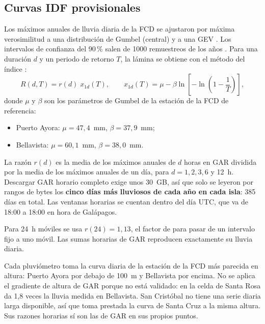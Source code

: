 \documentclass{sosg-informe}
\begin{document}
\subsection{Curvas IDF provisionales}\label{sec:idf}
Los máximos anuales de lluvia diaria de la FCD se ajustaron por máxima verosimilitud a una distribución de Gumbel (central) y a una GEV \citep[sensibilidad;][]{coles2001}. Los intervalos de confianza del 90\,\% salen de 1000 remuestreos de los años \citep[\emph{bootstrap};][]{efron1993}. Para una duración $d$ y un periodo de retorno $T$, la lámina se obtiene con el método del índice \citep{hosking1997}:
\begin{equation}
  R(d,T) = r(d)\; x_{1d}(T), \qquad x_{1d}(T) = \mu - \beta \ln\!\left[-\ln\!\left(1 - \frac{1}{T}\right)\right],
\end{equation}
donde $\mu$ y $\beta$ son los parámetros de Gumbel de la estación de la FCD de referencia:
\begin{itemize}
  \item Puerto Ayora: $\mu = 47,4$~mm, $\beta = 37,9$~mm;
  \item Bellavista: $\mu = 60,1$~mm, $\beta = 38,0$~mm.
\end{itemize}

La razón $r(d)$ es la media de los máximos anuales de $d$ horas en GAR dividida por la media de los máximos anuales de un día, para $d = 1, 2, 3, 6$ y 12~h. Descargar GAR horario completo exige unos 30~GB, así que solo se leyeron por rangos de bytes los \textbf{cinco días más lluviosos de cada año en cada isla}: 385 días en total. Las ventanas horarias se cuentan dentro del día UTC, que va de 18:00 a 18:00 en hora de Galápagos.

Para 24~h móviles se usa $r(24) = 1,13$, el factor de \citet{weiss1964} para pasar de un intervalo fijo a uno móvil. Las sumas horarias de GAR reproducen exactamente su lluvia diaria.

Cada pluviómetro toma la curva diaria de la estación de la FCD más parecida en altura: Puerto Ayora por debajo de 100~m y Bellavista por encima. No se aplica el gradiente de altura de GAR porque no está validado: en la celda de Santa Rosa da 1,8 veces la lluvia medida en Bellavista. San Cristóbal no tiene una serie diaria larga disponible, así que toma prestada la curva de Santa Cruz a la misma altura. Sus razones horarias sí son las de GAR en sus propios puntos.
\end{document}
